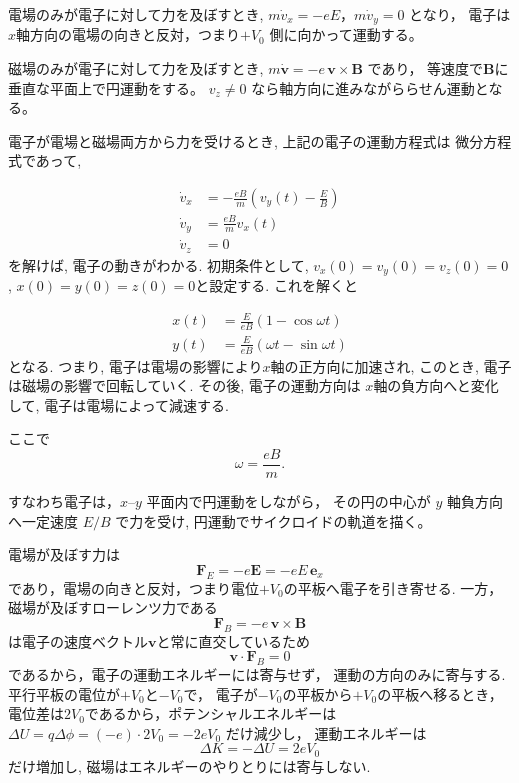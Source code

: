 \documentclass[a4paper,12pt]{jlreq}
\begin{document}
電場のみが電子に対して力を及ぼすとき, 
$m\dot v_x = -eE$，$m\dot v_y=0$ となり，
電子は$x$軸方向の電場の向きと反対，つまり$+V_0$ 側に向かって運動する。\par

磁場のみが電子に対して力を及ぼすとき, 
$m\dot{\bm v}=-e\,\bm{v}\times\bm{B}$ であり，
等速度で$\bm{B}$に垂直な平面上で円運動をする。
$v_z\neq 0$ なら軸方向に進みながららせん運動となる。


電子が電場と磁場両方から力を受けるとき, 上記の電子の運動方程式は
微分方程式であって, 

\[
\begin{aligned}
  \dot{v}_x &= -\frac{eB}{m} \left(v_y(t) - \frac{E}{B}\right) \\
  \dot{v}_y &= \frac{eB}{m} v_x(t)\\
  \dot{v}_z &= 0
\end{aligned}
\]
を解けば, 電子の動きがわかる. 
初期条件として, $v_x(0) = v_y(0) = v_z(0) = 0$, 
$x(0) = y(0) = z(0) = 0$と設定する. これを解くと

\[
\begin{aligned}
  x(t) &= \frac{E}{eB} (1 - \cos \omega t)\\
  y(t) &= \frac{E}{eB} (\omega t - \sin \omega t)
\end{aligned}
\]
となる. つまり, 電子は電場の影響により$x$軸の正方向に加速され, 
このとき, 電子は磁場の影響で回転していく. その後, 電子の運動方向は
$x$軸の負方向へと変化して, 電子は電場によって減速する. 

ここで
\[
  \omega = \frac{eB}{m}.
\]


すなわち電子は，$x$–$y$ 平面内で円運動をしながら，
その円の中心が $y$ 軸負方向へ一定速度 $E/B$ で力を受け, 
円運動でサイクロイドの軌道を描く。






\vspace{30mm}



電場が及ぼす力は
\[
  \bm{F}_E = -e\bm{E} = -eE\,\bm{e}_x
\]
であり，電場の向きと反対，つまり電位$+V_0$の平板へ電子を引き寄せる.
一方，磁場が及ぼすローレンツ力である
\[
  \bm{F}_B = -e\,\bm{v}\times\bm{B}
\]
は電子の速度ベクトル$\bm{v}$と常に直交しているため
\[
  \bm{v}\cdot\bm{F}_B = 0
\]
であるから，電子の運動エネルギーには寄与せず，
運動の方向のみに寄与する.
平行平板の電位が$+V_0$と$-V_0$で，
電子が$-V_0$の平板から$+V_0$の平板へ移るとき，
電位差は$2V_0$であるから，ポテンシャルエネルギーは
$\Delta U = q\Delta\phi = (-e)\cdot 2V_0 = -2eV_0$ だけ減少し，
運動エネルギーは
\[
  \Delta K = -\Delta U = 2eV_0
\]
だけ増加し, 磁場はエネルギーのやりとりには寄与しない.
\end{document}
